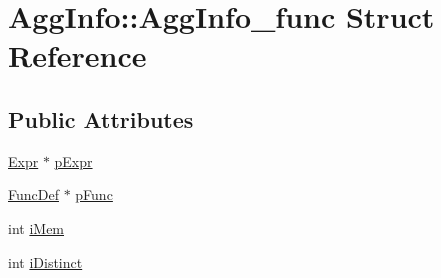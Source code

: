 \hypertarget{struct_agg_info_1_1_agg_info__func}{\section{Agg\-Info\-:\-:Agg\-Info\-\_\-func Struct Reference}
\label{struct_agg_info_1_1_agg_info__func}
}
\subsection*{Public Attributes}
\begin{DoxyCompactItemize}
\item 
\hyperlink{struct_expr}{Expr} $\ast$ \hyperlink{struct_agg_info_1_1_agg_info__func_a7b92e1c42e60d44e28ebf695316f4018}{p\-Expr}
\item 
\hyperlink{struct_func_def}{Func\-Def} $\ast$ \hyperlink{struct_agg_info_1_1_agg_info__func_a840478e8ec53cefa57b50228f6fdafe4}{p\-Func}
\item 
int \hyperlink{struct_agg_info_1_1_agg_info__func_a41a8da36555c37fffc65f1acead49a4f}{i\-Mem}
\item 
int \hyperlink{struct_agg_info_1_1_agg_info__func_a4a82635b0116eb44ec8ca9e47cc509d9}{i\-Distinct}
\end{DoxyCompactItemize}


